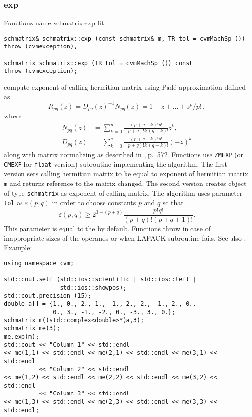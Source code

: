 \subsubsection{exp}
Functions%
\pdfdest name {schmatrix.exp} fit
\begin{verbatim}
schmatrix& schmatrix::exp (const schmatrix& m, TR tol = cvmMachSp ())
throw (cvmexception);

schmatrix schmatrix::exp (TR tol = cvmMachSp ()) const
throw (cvmexception);
\end{verbatim}
compute  exponent of  calling hermitian matrix using Pad\'e approximation
defined as
\begin{equation*}
R_{pq}(z)=D_{pq}(z)^{-1}N_{pq}(z)=1+z+\dots+z^p/p!\,,
\end{equation*}
where
\begin{align*}
N_{pq}(z)&=\sum_{k=0}^p\frac{(p+q-k)!p!}{(p+q)!k!(q-k)!}z^k,\\
D_{pq}(z)&=\sum_{k=0}^q\frac{(p+q-k)!p!}{(p+q)!k!(q-k)!}(-z)^k
\end{align*}
along with  matrix normalizing as described in
, p.~572.
Functions use \verb"ZMEXP" (or \verb"CMEXP" for \verb"float" version)
\FORTRAN subroutine implementing the algorithm.
The first version sets  calling hermitian matrix to be equal to
 exponent of  hermitian matrix \verb"m" and returns 
 reference to the matrix
changed. The second version
creates  object of type \verb"schmatrix" as 
exponent of  calling matrix.
The algorithm uses parameter \verb"tol"
as $\varepsilon(p,q)$ in order to choose constants $p$ and $q$
so that
\begin{equation*}
\varepsilon(p,q)\ge 2^{3-(p+q)}\frac{p!q!}{(p+q)!(p+q+1)!}.
\end{equation*}
This parameter is equal to the
 by default.
Functions throw   
in case of
inappropriate sizes of the operands or when LAPACK subroutine fails.
See also
.
Example:
\begin{Verbatim}
using namespace cvm;

std::cout.setf (std::ios::scientific | std::ios::left |
                std::ios::showpos);
std::cout.precision (15);
double a[] = {1., 0., 2., 1., -1., 2., 2., -1., 2., 0.,
              0., 3., -1., -2., 0., -3., 3., 0.};
schmatrix m((std::complex<double>*)a,3);
schmatrix me(3);
me.exp(m);
std::cout << "Column 1" << std::endl
<< me(1,1) << std::endl << me(2,1) << std::endl << me(3,1) << std::endl
          << "Column 2" << std::endl
<< me(1,2) << std::endl << me(2,2) << std::endl << me(3,2) << std::endl
          << "Column 3" << std::endl
<< me(1,3) << std::endl << me(2,3) << std::endl << me(3,3) << std::endl;
\end{Verbatim}
